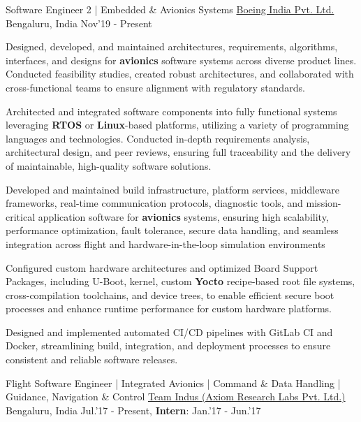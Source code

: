 \begin{cventries}
	\cventry
	{\large Software Engineer 2 | Embedded \& Avionics Systems}
	{\href{https://www.boeing.co.in/}{\large Boeing India Pvt. Ltd.}}
	{\large Bengaluru, India}
	{\large Nov'19 - Present}
	{
		\begin{cvitems}
		\item{\large Designed, developed, and maintained architectures, requirements, algorithms, interfaces, and designs for \textbf{avionics} software systems across diverse product lines. Conducted feasibility studies, created robust architectures, and collaborated with cross-functional teams to ensure alignment with regulatory standards.}
		\item{\large Architected and integrated software components into fully functional systems leveraging \textbf{RTOS} or \textbf{Linux}-based platforms, utilizing a variety of programming languages and technologies. Conducted in-depth requirements analysis, architectural design, and peer reviews, ensuring full traceability and the delivery of maintainable, high-quality software solutions.}
		\item{\large Developed and maintained build infrastructure, platform services, middleware frameworks, real-time communication protocols, diagnostic tools, and mission-critical application software for \textbf{avionics} systems, ensuring high scalability, performance optimization, fault tolerance, secure data handling, and seamless integration across flight and hardware-in-the-loop simulation environments}
		\item{\large Configured custom hardware architectures and optimized Board Support Packages, including U-Boot, kernel, custom \textbf{Yocto} recipe-based root file systems, cross-compilation toolchains, and device trees, to enable efficient secure boot processes and enhance runtime performance for custom hardware platforms.}
		\item{\large Designed and implemented automated CI/CD pipelines with GitLab CI and Docker, streamlining build, integration, and deployment processes to ensure consistent and reliable software releases.}
		\end{cvitems}
	}
    \cventry
    {\large Flight Software Engineer | Integrated Avionics | Command \& Data Handling | Guidance, Navigation \& Control}
	{\href{http://www.teamindus.in/}{\large Team Indus (Axiom Research Labs Pvt. Ltd.)}}
	{\large Bengaluru, India}
	{\large Jul.'17 - Present, \textbf{Intern}: Jan.'17 - Jun.'17}
	{
		\begin{cvitems}

\end{cvitems}}
\end{cventries}
